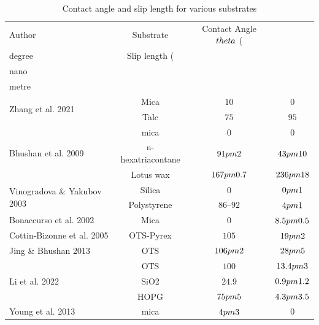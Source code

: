 
\begin{table}
    \caption{Contact angle and slip length for various substrates}
    \label{tbl:Previous_contact_angle_slip}
    \begin{tabular}{lccc}
        \hline
        Author & Substrate & Contact Angle $\\theta$ (\si{\\degree}) & Slip length (\si{\\nano\\metre}) \\
        \hline
    \multirow{2}{*}{Zhang et al. 2021} & Mica & $10$ & $0$ \\
     & Talc & $75$ & $95$ \\
    \multirow{3}{*}{Bhushan et al. 2009} & mica & $0$ & $0$ \\
     & n-hexatriacontane & $91 \\pm 2$ & $43 \\pm 10$ \\
     & Lotus wax & $167 \\pm 0.7$ & $236 \\pm 18$ \\
    \multirow{2}{*}{Vinogradova \& Yakubov 2003} & Silica & $0$ & $0 \\pm 1$ \\
     & Polystyrene & $86$--$92$ & $4 \\pm 1$ \\
    \multirow{1}{*}{Bonaccurso et al. 2002} & Mica & $0$ & $8.5 \\pm 0.5$ \\
    \multirow{1}{*}{Cottin-Bizonne et al. 2005} & OTS-Pyrex & $105$ & $19 \\pm 2$ \\
    \multirow{1}{*}{Jing \& Bhushan 2013} & OTS & $106 \\pm 2$ & $28 \\pm 5$ \\
    \multirow{3}{*}{Li et al. 2022} & OTS & $100$ & $13.4 \\pm 3$ \\
     & SiO2 & $24.9$ & $0.9 \\pm 1.2$ \\
     & HOPG & $75 \\pm 5$ & $4.3 \\pm 3.5$ \\
    \multirow{5}{*}{Young et al. 2013} & mica & $4 \\pm 3$ & $0$ \\

\end{tabular}
\end{table}
